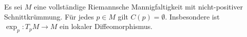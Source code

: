 Es sei $M$ eine vollständige Riemannsche Mannigfaltigkeit \pause mit nicht-positiver Schnittkrümmung. \pause Für jedes $p\in M$ gilt \pause $C(p)=\emptyset$. \pause Insbesondere ist $\exp_p\colon T_pM\to M$ ein lokaler Diffeomorphismus.